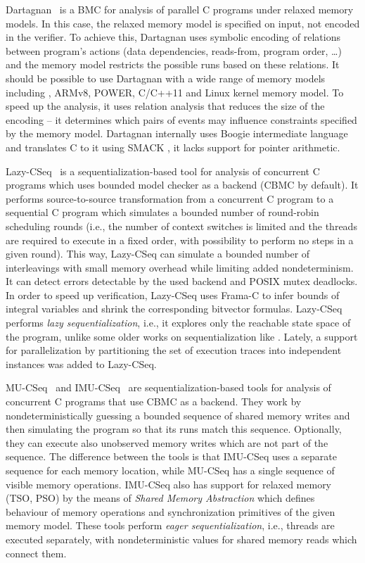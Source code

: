 Dartagnan~ is a BMC for analysis of parallel C programs under relaxed memory models.
In this case, the relaxed memory model is specified on input, not encoded in the verifier.
To achieve this, Dartagnan uses symbolic encoding of relations between program's actions (data dependencies, reads-from, program order, …) and the memory model restricts the possible runs based on these relations.
It should be possible to use Dartagnan with a wide range of memory models including \xtso, ARMv8, POWER, C/C++11 and Linux kernel memory model.
To speed up the analysis, it uses relation analysis that reduces the size of the encoding -- it determines which pairs of events may influence constraints specified by the memory model.
Dartagnan internally uses Boogie intermediate language and translates C to it using SMACK , it lacks support for pointer arithmetic.

Lazy-CSeq~ is a se\-quen\-tial\-iza\-tion-based
tool for analysis of concurrent C programs which uses bounded model checker as
a backend (CBMC by default).
It performs source-to-source transformation from a concurrent C program to a
sequential C program which simulates a bounded number of round-robin scheduling
rounds (i.e., the number of context switches is limited and the threads are
required to execute in a fixed order, with possibility to perform no steps in a
given round).
This way, Lazy-CSeq can simulate a bounded number of interleavings with small
memory overhead while limiting added nondeterminism.
It can detect errors detectable by the used backend and POSIX mutex deadlocks.
In order to speed up verification, Lazy-CSeq uses Frama-C  to
infer bounds of integral variables and shrink the corresponding bitvector
formulas.
Lazy-CSeq performs \emph{lazy sequentialization}, i.e., it explores only the reachable state space of the program, unlike some older works on sequentialization like .
Lately, a support for parallelization by partitioning the set of execution traces into independent instances was added to Lazy-CSeq.

MU-CSeq~ and IMU-CSeq~
are se\-quen\-tial\-iza\-tion-based tools for analysis of concurrent C programs
that use CBMC as a backend.
They work by nondeterministically guessing a bounded sequence of shared memory
writes and then simulating the program so that its runs match this sequence.
Optionally, they can execute also unobserved memory writes which are not part of the
sequence.
The difference between the tools is that IMU-CSeq uses a separate sequence for
each memory location, while MU-CSeq has a single sequence of visible memory
operations.
IMU-CSeq also has support for relaxed memory (TSO, PSO) by the means of
\emph{Shared Memory Abstraction} which defines behaviour of memory operations
and synchronization primitives of the given memory model.
These tools perform \emph{eager sequentialization}, i.e., threads are executed separately, with nondeterministic values for shared memory reads which connect them.

